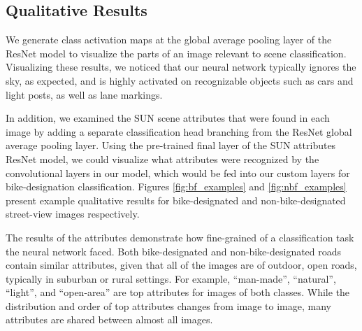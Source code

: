 \documentclass[10pt,twocolumn,letterpaper]{article}
\begin{document}
\subsection{Qualitative Results}
\label{sec:qualitative}
We generate class activation maps at the global average pooling layer of the ResNet model to visualize the parts of an image relevant to scene classification. Visualizing these results, we noticed that our neural network typically ignores the sky, as expected, and is highly activated on recognizable objects such as cars and light posts, as well as lane markings.

In addition, we examined the SUN scene attributes that were found in each image by adding a separate classification head branching from the ResNet global average pooling layer. Using the pre-trained final layer of the SUN attributes ResNet model, we could visualize what attributes were recognized by the convolutional layers in our model, which would be fed into our custom layers for bike-designation classification. Figures \ref{fig:bf_examples} and \ref{fig:nbf_examples} present example qualitative results for bike-designated and non-bike-designated street-view images respectively.

The results of the attributes demonstrate how fine-grained of a classification task the neural network faced. Both bike-designated and non-bike-designated roads contain similar attributes, given that all of the images are of outdoor, open roads, typically in suburban or rural settings. For example, ``man-made'', ``natural'', ``light'', and ``open-area'' are top attributes for images of both classes. While the distribution and order of top attributes changes from image to image, many attributes are shared between almost all images.
\end{document}

